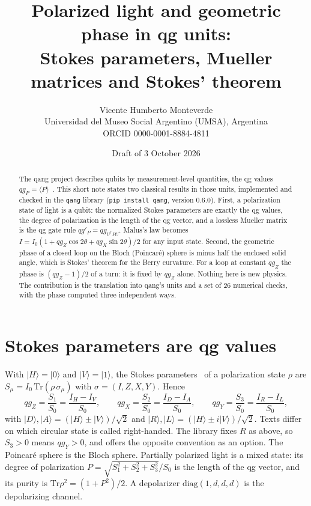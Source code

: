 \documentclass[11pt]{article}
\title{Polarized light and geometric phase in qg units:\\
Stokes parameters, Mueller matrices and Stokes' theorem}
\author{Vicente Humberto Monteverde\\
\small Universidad del Museo Social Argentino (UMSA), Argentina\\
\small ORCID 0000-0001-8884-4811}
\date{\small Draft of 3 October 2026}
\begin{document}
\sloppy
\maketitle

\begin{abstract}
The qang project describes qubits by measurement-level quantities, the qg values
$qg_P=\langle P\rangle$~\cite{monteverde2026qang}. This short note states two classical results in those units,
implemented and checked in the \texttt{qang} library (\texttt{pip install qang}, version 0.6.0). First, a
polarization state of light is a qubit: the normalized Stokes parameters are exactly the qg values, the
degree of polarization is the length of the qg vector, and a lossless Mueller matrix is the qg gate rule
$qg'_P=qg_{U^\dagger PU}$. Malus's law becomes $I=I_0(1+qg_Z\cos2\theta+qg_X\sin2\theta)/2$ for any input
state. Second, the geometric phase of a closed loop on the Bloch (Poincar\'e) sphere is minus half the enclosed
solid angle, which is Stokes' theorem for the Berry curvature. For a loop at constant $qg_Z$ the phase is
$(qg_Z-1)/2$ of a turn: it is fixed by $qg_Z$ alone. Nothing here is new physics. The contribution is the
translation into qang's units and a set of 26 numerical checks, with the phase computed three independent
ways.
\end{abstract}

\section{Stokes parameters are qg values}

With $|H\rangle=|0\rangle$ and $|V\rangle=|1\rangle$, the Stokes parameters~\cite{stokes1852} of a polarization
state $\rho$ are $S_\mu=I_0\,\mathrm{Tr}(\rho\,\sigma_\mu)$ with $\sigma=(I,Z,X,Y)$. Hence
\begin{equation}
qg_Z=\frac{S_1}{S_0}=\frac{I_H-I_V}{S_0},\qquad
qg_X=\frac{S_2}{S_0}=\frac{I_D-I_A}{S_0},\qquad
qg_Y=\frac{S_3}{S_0}=\frac{I_R-I_L}{S_0},
\end{equation}
with $|D\rangle,|A\rangle=(|H\rangle\pm|V\rangle)/\sqrt2$ and $|R\rangle,|L\rangle=(|H\rangle\pm i|V\rangle)/\sqrt2$.
Texts differ on which circular state is called right-handed. The library fixes $R$ as above, so $S_3>0$ means
$qg_Y>0$, and offers the opposite convention as an option. The Poincar\'e sphere is the Bloch sphere. Partially
polarized light is a mixed state: its degree of polarization $P=\sqrt{S_1^2+S_2^2+S_3^2}/S_0$ is the length of
the qg vector, and its purity is $\mathrm{Tr}\rho^2=(1+P^2)/2$. A depolarizer
$\mathrm{diag}(1,d,d,d)$ is the depolarizing channel.
\end{document}
